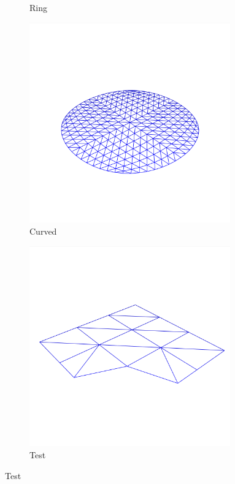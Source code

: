 \documentclass[crop=false,10pt,ngerman]{standalone}
\begin{document}
\begin{figure}[h]
\begin{subfigure}[b]{0.24\textwidth}
          \caption{Ring}
        \end{subfigure}
        \begin{subfigure}[b]{0.24\textwidth}
          \center
          \includegraphics[trim={0 0 0 2cm},clip,width=0.95\textwidth]{images/model-circle-0.png}
          \caption{Curved}
        \end{subfigure}
        \begin{subfigure}[b]{0.24\textwidth}
          \center
          \includegraphics[trim={0 0 0 2cm},clip,width=0.95\textwidth]{images/model-test-0.png}
          \caption{Test}
        \end{subfigure}
      \end{figure}
\end{document}

